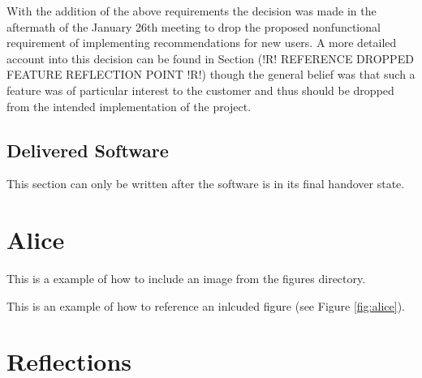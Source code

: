 \documentclass{l3proj}
\begin{document}
With the addition of the above requirements the decision was made in the aftermath of the January 26th meeting to drop the proposed nonfunctional requirement of implementing recommendations for new users. A more detailed account into this decision can be found in Section (!R! REFERENCE DROPPED FEATURE REFLECTION POINT !R!) though the general belief was that such a feature was of particular interest to the customer and thus should be dropped from the intended implementation of the project.


\subsection{Delivered Software}
\label{sec:finsoftware}
This section can only be written after the software is in its final handover state.
\newpage


\section{Alice}
\label{sec:alice}

This is a example of how to include an image from the figures directory.



This is an example of how to reference an inlcuded figure (see Figure \ref{fig:alice}).

\section{Reflections}
\label{sec:reflections}

\end{document}
